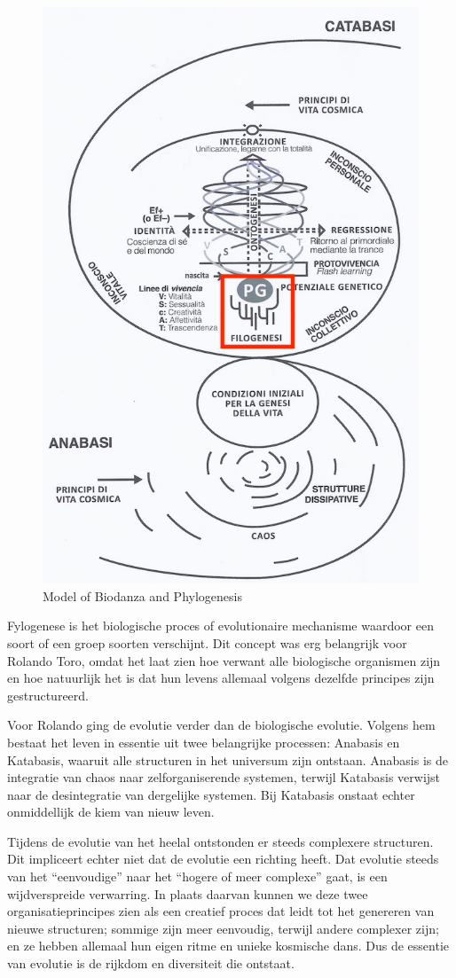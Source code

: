 \documentclass[
  11pt,
]{book}
\begin{document}
\begin{figure}

{\centering \includegraphics[width=0.5\linewidth]{./figs/biologischeAspectenBiodanzaDeelII} 

}

\caption{Model of Biodanza and Phylogenesis}\label{fig:modelPhylo}
\end{figure}

Fylogenese is het biologische proces of evolutionaire mechanisme waardoor een soort of een groep soorten verschijnt. Dit concept was erg belangrijk voor Rolando Toro, omdat het laat zien hoe verwant alle biologische organismen zijn en hoe natuurlijk het is dat hun levens allemaal volgens dezelfde principes zijn gestructureerd.

Voor Rolando ging de evolutie verder dan de biologische evolutie. Volgens hem bestaat het leven in essentie uit twee belangrijke processen: Anabasis en Katabasis, waaruit alle structuren in het universum zijn ontstaan. Anabasis is de integratie van chaos naar zelforganiserende systemen, terwijl Katabasis verwijst naar de desintegratie van dergelijke systemen. Bij Katabasis onstaat echter onmiddellijk de kiem van nieuw leven.

Tijdens de evolutie van het heelal ontstonden er steeds complexere structuren. Dit impliceert echter niet dat de evolutie een richting heeft. Dat evolutie steeds van het ``eenvoudige'' naar het ``hogere of meer complexe'' gaat, is een wijdverspreide verwarring. In plaats daarvan kunnen we deze twee organisatieprincipes zien als een creatief proces dat leidt tot het genereren van nieuwe structuren; sommige zijn meer eenvoudig, terwijl andere complexer zijn; en ze hebben allemaal hun eigen ritme en unieke kosmische dans. Dus de essentie van evolutie is de rijkdom en diversiteit die ontstaat.
\end{document}
